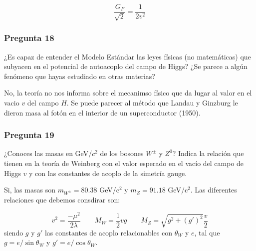 \begin{equation}
	\frac{G_F}{\sqrt{2}} = \frac{1}{2 v^2}
\end{equation}



\vspace*{2em}

\begin{Enunciado}
	\subsubsection*{Pregunta 18}

	¿Es capaz de entender el Modelo Estándar las leyes físicas (no matemáticas) que subyacen en el potencial de autoacoplo del campo de Higgs? ¿Se parece a algún fenómeno que hayas estudiado en otras materias?

\end{Enunciado}

No, la teoría no nos informa sobre el mecanimso físico que da lugar al valor en el vacio $v$ del campo $H$. Se puede parecer al método que Landau y Ginzburg le dieron masa al fotón en el interior de un superconductor (1950).


\vspace*{2em}

\begin{Enunciado}
	\subsubsection*{Pregunta 19}

	¿Conoces las masas en GeV/$c^2$ de los bosones $W^\pm$ y $Z^0$? Indica la relación que tienen en la teoría de Weinberg con el valor esperado en el vacío del campo de Higgs $v$ y con las constantes de acoplo de la simetría gauge.

\end{Enunciado}

Si, las masas son $m_{W^{\pm}}=80.38$ GeV/c$^2$ y $m_Z=91.18$ GeV/c$^2$. Las diferentes relaciones que debemos consdirar son:

\begin{equation}
	v^2 = \frac{-\mu^2}{2\lambda} \qquad M_{W} = \frac{1}{2} v g \qquad M_{Z}= \sqrt{g^2 + (g')^2}\frac{v}{2}
\end{equation}
siendo $g$ y $g'$ las constantes de acoplo relacionables con $\theta_W$ y $e$, tal que $g=e/\sin \theta_W$ y $g'=e/\cos \theta_W$.


\vspace*{2em}


